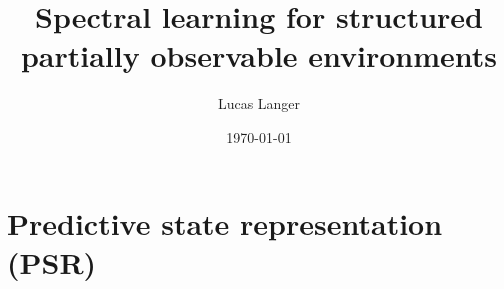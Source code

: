 \documentclass{beamer}
\title[Spectral learning with structure]{Spectral learning for structured partially observable environments} %
\author{Lucas Langer} %
\institute[McGill University] %
{
Supervisors: Borja Balle, Doina Precup \\
\medskip
}
\date{\today} %
\begin{document}
\begin{frame}
\titlepage %
\end{frame}

\section{Predictive state representation (PSR)} %



\end{document}

